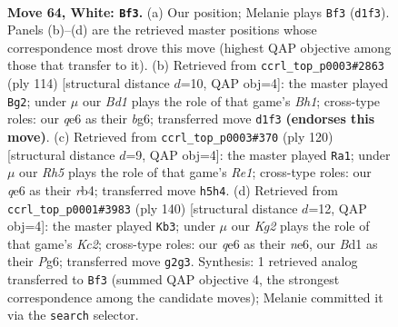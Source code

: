 \documentclass[11pt]{article}
\begin{document}
\clearpage

\begin{figure}[p]\centering
\begin{subfigure}{0.46\textwidth}\centering
\resizebox{\linewidth}{!}{%
\newchessgame
\chessboard[
  setfen={8/8/4q3/7R/1p1k4/b7/6K1/3B4 w - - 18 64},
  showmover=false,
  pgfstyle=straightmove, color=movearrow, markmove={d1-f3}
]}
\caption{}
\end{subfigure}\hfill
\begin{subfigure}{0.46\textwidth}\centering
\resizebox{\linewidth}{!}{%
\newchessgame
\chessboard[
  setfen={8/1R6/5pb1/6bp/3k4/8/8/5K1B w - - 12 58},
  showmover=false,
  pgfstyle=straightmove, color=movearrow, markmove={h1-g2}
]}
\caption{}
\end{subfigure}
\\[4pt]
\begin{subfigure}{0.46\textwidth}\centering
\resizebox{\linewidth}{!}{%
\newchessgame
\chessboard[
  setfen={2B5/8/3k3p/6b1/1r6/5K2/8/4R3 w - - 13 61},
  showmover=false,
  pgfstyle=straightmove, color=movearrow, markmove={e1-a1}
]}
\caption{}
\end{subfigure}\hfill
\begin{subfigure}{0.46\textwidth}\centering
\resizebox{\linewidth}{!}{%
\newchessgame
\chessboard[
  setfen={8/5R2/4n1P1/p7/1b2k3/8/2K5/8 w - - 1 71},
  showmover=false,
  pgfstyle=straightmove, color=movearrow, markmove={c2-b3}
]}
\caption{}
\end{subfigure}
\caption{\textbf{Move 64, White: \texttt{Bf3}.} (a) Our position; Melanie plays \texttt{Bf3} (\texttt{d1f3}). Panels (b)--(d) are the retrieved master positions whose correspondence most drove this move (highest QAP objective among those that transfer to it). (b) Retrieved from \texttt{ccrl\_top\_p0003\#2863} (ply 114) [structural distance $d$=10, QAP obj=4]: the master played \texttt{Bg2}; under $\mu$ our \emph{Bd1} plays the role of that game's \emph{Bh1}; cross-type roles: our \emph{q}e6 as their \emph{b}g6; transferred move \texttt{d1f3} \textbf{(endorses this move)}. (c) Retrieved from \texttt{ccrl\_top\_p0003\#370} (ply 120) [structural distance $d$=9, QAP obj=4]: the master played \texttt{Ra1}; under $\mu$ our \emph{Rh5} plays the role of that game's \emph{Re1}; cross-type roles: our \emph{q}e6 as their \emph{r}b4; transferred move \texttt{h5h4}. (d) Retrieved from \texttt{ccrl\_top\_p0001\#3983} (ply 140) [structural distance $d$=12, QAP obj=4]: the master played \texttt{Kb3}; under $\mu$ our \emph{Kg2} plays the role of that game's \emph{Kc2}; cross-type roles: our \emph{q}e6 as their \emph{n}e6, our \emph{B}d1 as their \emph{P}g6; transferred move \texttt{g2g3}. Synthesis: 1 retrieved analog transferred to \texttt{Bf3} (summed QAP objective 4, the strongest correspondence among the candidate moves); Melanie committed it via the \texttt{search} selector.}
\label{fig:thought-m126}
\end{figure}
\end{document}
